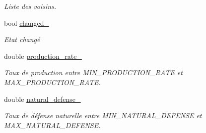 \begin{DoxyCompactItemize}
\begin{DoxyCompactList}\small\item\em Liste des voisins. \end{DoxyCompactList}\item 
bool \hyperlink{classVirtual__planet_aa5ebb40e5a4ed0a631b120749f938f35}{changed\-\_\-}
\begin{DoxyCompactList}\small\item\em Etat changé \end{DoxyCompactList}\item 
double \hyperlink{classVirtual__planet_a6f8de6a5104185b9c36c64a45260fab6}{production\-\_\-rate\-\_\-}
\begin{DoxyCompactList}\small\item\em Taux de production entre M\-I\-N\-\_\-\-P\-R\-O\-D\-U\-C\-T\-I\-O\-N\-\_\-\-R\-A\-T\-E et M\-A\-X\-\_\-\-P\-R\-O\-D\-U\-C\-T\-I\-O\-N\-\_\-\-R\-A\-T\-E. \end{DoxyCompactList}\item 
double \hyperlink{classVirtual__planet_af62ede97e609fd17818af229799dbe3b}{natural\-\_\-defense\-\_\-}
\begin{DoxyCompactList}\small\item\em Taux de défense naturelle entre M\-I\-N\-\_\-\-N\-A\-T\-U\-R\-A\-L\-\_\-\-D\-E\-F\-E\-N\-S\-E et M\-A\-X\-\_\-\-N\-A\-T\-U\-R\-A\-L\-\_\-\-D\-E\-F\-E\-N\-S\-E. \end{DoxyCompactList}\end{DoxyCompactItemize}

